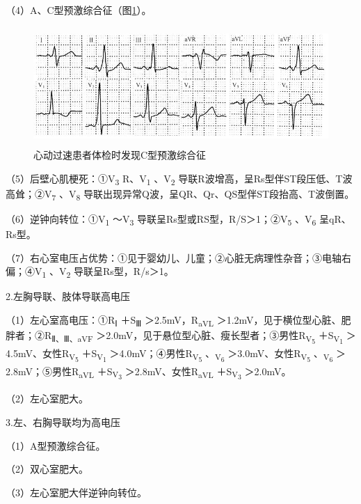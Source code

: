 （4）A、C型预激综合征（图\ref{fig3-2}）。

\begin{figure}[!htbp]
 \centering
 \includegraphics[width=4.96875in,height=1.77083in]{./images/Image00051.jpg}
 \captionsetup{justification=centering}
 \caption{心动过速患者体检时发现C型预激综合征}
 \label{fig3-2}
  \end{figure} 

（5）后壁心肌梗死：①V\textsubscript{3} R、V\textsubscript{1}
、V\textsubscript{2}
导联R波增高，呈Rs型伴ST段压低、T波高耸；②V\textsubscript{7}
、V\textsubscript{8}
导联出现异常Q波，呈QR、Qr、QS型伴ST段抬高、T波倒置。

（6）逆钟向转位：①V\textsubscript{1} ～V\textsubscript{3}
导联呈Rs型或RS型，R/S＞1；②V\textsubscript{5} 、V\textsubscript{6}
呈qR、Rs型。

（7）右心室电压占优势：①见于婴幼儿、儿童；②心脏无病理性杂音；③电轴右偏；④V\textsubscript{1}
、V\textsubscript{2} 导联呈Rs型，R/s＞1。

2.左胸导联、肢体导联高电压

（1）左心室高电压：①R\textsubscript{Ⅰ} ＋S\textsubscript{Ⅲ}
＞2.5mV，R\textsubscript{aVL}
＞1.2mV，见于横位型心脏、肥胖者；②R\textsubscript{Ⅱ、Ⅲ、aVF}
＞2.0mV，见于悬位型心脏、瘦长型者；③男性R\textsubscript{V\textsubscript{5}}
＋S\textsubscript{V\textsubscript{1}}
＞4.5mV、女性R\textsubscript{V\textsubscript{5}}
＋S\textsubscript{V\textsubscript{1}}
＞4.0mV；④男性R\textsubscript{V\textsubscript{5}}
、\textsubscript{V\textsubscript{6}}
＞3.0mV、女性R\textsubscript{V\textsubscript{5}}
、\textsubscript{V\textsubscript{6}} ＞2.8mV；⑤男性R\textsubscript{aVL}
＋S\textsubscript{V\textsubscript{3}} ＞2.8mV、女性R\textsubscript{aVL}
＋S\textsubscript{V\textsubscript{3}} ＞2.0mV。

（2）左心室肥大。

3.左、右胸导联均为高电压

（1）A型预激综合征。

（2）双心室肥大。

（3）左心室肥大伴逆钟向转位。

